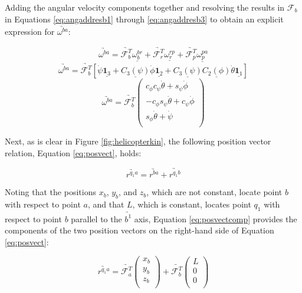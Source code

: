 \documentclass[journal]{IEEEtran}
\begin{document}
Adding the angular velocity components together and resolving the results in $\mathcal{F}_b$ in Equations \ref{eq:angaddresb1} through \ref{eq:angaddresb3} to obtain an explicit expression for $\underrightarrow{\omega^{ba}}$:

\begin{equation}
	\underrightarrow{\omega^{ba}}=\underrightarrow{\mathcal{F}^T_b}\underline{\omega^{br}_b}+\underrightarrow{\mathcal{F}^T_r}\underline{\omega^{rp}_r}+\underrightarrow{\mathcal{F}^T_p}\underline{\omega^{pa}_p}
	\label{eq:angaddresb1}
\end{equation}
\begin{equation}
\underrightarrow{\omega^{ba}}=\underrightarrow{\mathcal{F}^T_b}[\dot{\psi}\underline{\mathbf{1}_3}+\underline{C_3(\psi)}\dot{\phi}\underline{\mathbf{1}_2}+\underline{C_3(\psi)}\underline{C_2(\phi)}\dot{\theta}\underline{\mathbf{1}_1}]
\label{eq:angaddresb2}
\end{equation}
\begin{equation}
\underrightarrow{\omega^{ba}}=\underrightarrow{\mathcal{F}^T_b}
	\left( \begin{array}{c}
	c_{\phi}c_{\psi}\dot{\theta}+s_{\psi}\dot{\phi}  \\
	-c_{\phi}s_{\psi}\dot{\theta}+c_{\psi}\dot{\phi}  \\
	s_{\phi}\dot{\theta}+\dot{\psi} \\
	\end{array} \right)
\label{eq:angaddresb3}
\end{equation}

Next, as is clear in Figure \ref{fig:helicopterkin}, the following position vector relation, Equation \ref{eq:posvect}, holds:

\begin{equation}
	\underrightarrow{r^{q_1a}}=	\underrightarrow{r^{ba}}+	\underrightarrow{r^{q_1b}}
	\label{eq:posvect}
\end{equation}

Noting that the positions $x_b$, $y_b$, and $z_b$, which are not constant, locate point $b$ with respect to point $a$, and that $L$, which is constant, locates point $q_1$ with respect to point $b$ parallel to the $\underrightarrow{b^1}$ axis, Equation \ref{eq:posvectcomp} provides the components of the two position vectors on the right-hand side of Equation \ref{eq:posvect}:

\begin{equation}
	\underrightarrow{r^{q_1a}}=\underrightarrow{\mathcal{F}^T_a}
		\left( \begin{array}{c}
		x_b \\
		y_b \\
		z_b \\
		\end{array} \right)+\underrightarrow{\mathcal{F}^T_b}
				\left( \begin{array}{c}
				L \\
				0 \\
				0 \\
				\end{array} \right)			
	\label{eq:posvectcomp}
\end{equation}
\end{document}
